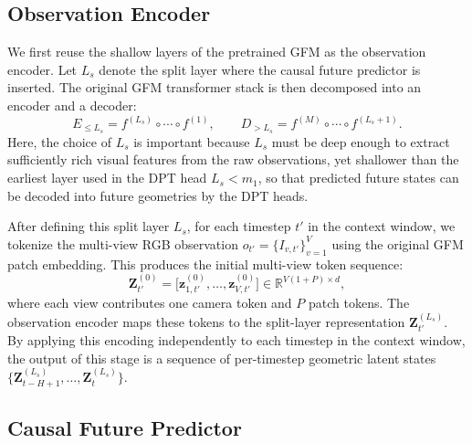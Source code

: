 \subsection{Observation Encoder}
\label{sec:method:encoding}
We first reuse the shallow layers of the pretrained GFM as the observation encoder. Let $L_s$ denote the split layer where the causal future predictor is inserted. The original GFM transformer stack is then decomposed into an encoder and a decoder:
\begin{equation}
    E_{\leq L_s}
    =
    f^{(L_s)}
    \circ
    \cdots
    \circ
    f^{(1)},
    \qquad
    D_{> L_s}
    =
    f^{(M)}
    \circ
    \cdots
    \circ
    f^{(L_s+1)} .
\end{equation}
Here, the choice of $L_s$ is important because $L_s$ must be deep enough to extract sufficiently rich visual features from the raw observations, yet shallower than the earliest layer used in the DPT head $L_s < m_1$, so that predicted future states can be decoded into future geometries by the DPT heads.

After defining this split layer $L_s$, for each timestep $t'$ in the context window, we tokenize the multi-view RGB observation $o_{t'}=\{I_{v,t'}\}_{v=1}^{V}$ using the original GFM patch embedding. This produces the initial multi-view token sequence:
\begin{equation}
    \mathbf{Z}_{t'}^{(0)}
    =
    \big[
        \mathbf{z}_{1,t'}^{(0)},\ldots,
        \mathbf{z}_{V,t'}^{(0)}
    \big]
    \in
    \mathbb{R}^{V(1+P)\times d},
\end{equation}
where each view contributes one camera token and $P$ patch tokens. The observation encoder maps these tokens to the split-layer representation $\mathbf{Z}_{t'}^{(L_s)}$. By applying this encoding independently to each timestep in the context window, the output of this stage is a sequence of per-timestep geometric latent states $\{\mathbf{Z}_{t-H+1}^{(L_s)},\ldots,\mathbf{Z}_{t}^{(L_s)}\}$.



\subsection{Causal Future Predictor}
\label{sec:method:predictor}

